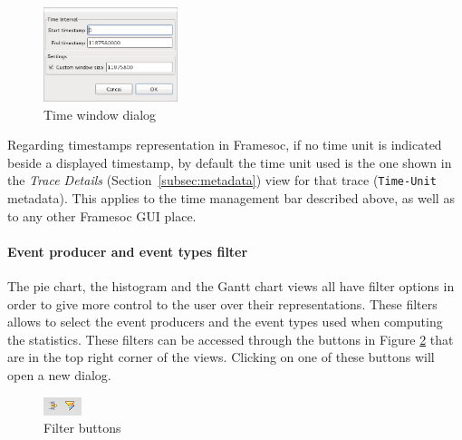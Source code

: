 \documentclass[twoside]{article}
\begin{document}
\begin{sloppypar}
\begin{figure}[h!]
  \centering
    \includegraphics[width=0.35\textwidth]{images/window_dialog.png}
  \caption{Time window dialog}
  \label{fig:window_dialog}
\end{figure}

Regarding timestamps representation in Framesoc, if no time unit is indicated beside a displayed timestamp, 
by default the time unit used is the one shown in the \emph{Trace Details} (Section~\ref{subsec:metadata}) view for that trace (\texttt{Time-Unit} metadata). 
This applies to the time management bar described above, as well as to any other Framesoc GUI place.


\paragraph{Event producer and event types filter}
The pie chart, the histogram and the Gantt chart views all have filter options in order to give more control to the user over their representations. These filters allows to select the event producers and the event types used when computing the statistics. These filters can be accessed through the buttons in Figure \ref{fig:filterButtons} that are in the top right corner of the views. Clicking on one of these buttons will open a new dialog. 

\begin{figure}[h!]
	\centering
		\includegraphics[width=0.1\textwidth]{images/filterButtons.png}
	\caption{Filter buttons}
	\label{fig:filterButtons}
\end{figure}


\end{sloppypar}
\end{document}
